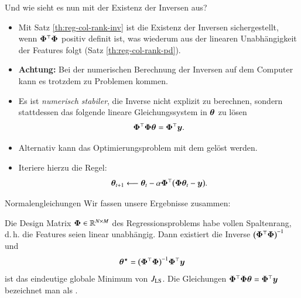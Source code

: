 \begin{frame}{Und wie sieht es nun mit der Existenz der Inversen aus?}{}
	\begin{itemize}
		\item Mit Satz \ref{th:reg-col-rank-inv} ist die Existenz der Inversen sichergestellt, wenn $\bm{\Phi}^\top \bm{\Phi}$ positiv definit ist,
			was wiederum aus der linearen Unabhängigkeit der Features folgt (Satz \ref{th:reg-col-rank-pd}).
		\item \textbf{Achtung:} Bei der numerischen Berechnung der Inversen auf dem Computer kann es
			trotzdem zu Problemen kommen.
		\item Es ist \textit{numerisch stabiler}, die Inverse nicht explizit zu berechnen,
			sondern stattdessen das folgende lineare Gleichungssystem in $\bm{\theta}$ zu lösen
			\begin{equation*}
				\bm{\Phi}^\top \bm{\Phi} \bm{\theta} = \bm{\Phi}^\top \bm{y}.
			\end{equation*}
		\item Alternativ kann das Optimierungsproblem mit dem  gelöst werden.
		\item Iteriere hierzu die Regel:
		\begin{equation}
			\bm{\theta}_{t+1} \longleftarrow \bm{\theta}_t - \alpha \bm{\Phi}^\top \bigl( \bm{\Phi} \bm{\theta}_t - \bm{y} \bigr). 
		\end{equation}
	\end{itemize}
\end{frame}


\begin{frame}{Normalengleichungen}{}
	Wir fassen unsere Ergebnisse zusammen:
	
	\begin{mytheo}
		Die Design Matrix $\bm{\Phi} \in \mathbb{R}^{N \times M}$ des Regressionsproblems habe vollen Spaltenrang,
		d.\,h. die Features seien linear unabhängig.
		Dann existiert die Inverse $\bigl( \bm{\Phi}^\top \bm{\Phi} \bigr)^{-1}$ und
		\begin{equation*}
			\bm{\theta}^\star = \bigl( \bm{\Phi}^\top \bm{\Phi} \bigr)^{-1} \bm{\Phi}^\top \bm{y}
		\end{equation*}
		ist das eindeutige globale Minimum von $J_{\text{LS}}$.
		Die Gleichungen $\bm{\Phi}^\top \bm{\Phi} \bm{\theta} = \bm{\Phi}^\top \bm{y}$ bezeichnet man als .
	\end{mytheo}
\end{frame}


